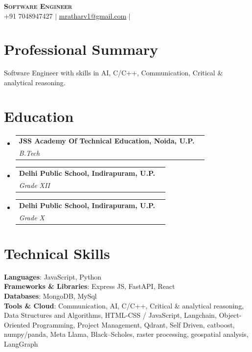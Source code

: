 \documentclass[letterpaper,10pt]{article}
\makeatletter
\newcommand{\resumeSubheading}[4]{
  \vspace{-2pt}\item
    \begin{tabular*}{0.97\textwidth}[t]{l@{\extracolsep{\fill}}r}
      \textbf{#1} & #2 \\
      \textit{\small#3} & \textit{\small #4} \\
    \end{tabular*}\vspace{-7pt}
}
\newcommand{\resumeSubHeadingListStart}{\begin{itemize}[leftmargin=0.15in, label={}]}
\newcommand{\resumeSubHeadingListEnd}{\end{itemize}}
\makeatother
\begin{document}
\begin{center}
    \textbf{\Huge \scshape Software Engineer} \\ \vspace{2pt}
    \small 
    +91 7048947427 $|$     \href{mailto:mratharv1@gmail.com}{\underline{mratharv1@gmail.com}} $|$             \end{center}

\section{Professional Summary}
\small{Software Engineer with skills in AI, C/C++, Communication, Critical \& analytical reasoning.}
\vspace{2pt}

\section{Education}
  \resumeSubHeadingListStart
          \resumeSubheading
        {JSS Academy Of Technical Education, Noida, U.P.}{}
        {B.Tech}{}
          \resumeSubheading
        {Delhi Public School, Indirapuram, U.P.}{}
        {Grade XII}{}
          \resumeSubheading
        {Delhi Public School, Indirapuram, U.P.}{}
        {Grade X}{}
      \resumeSubHeadingListEnd

\section{Technical Skills}
 \begin{itemize}[leftmargin=0.15in, label={}]
    \small{\item{
                        \textbf{Languages}: JavaScript, Python \\
                                \textbf{Frameworks & Libraries}: Express JS, FastAPI, React \\
                                \textbf{Databases}: MongoDB, MySql \\
                                \textbf{Tools & Cloud}: Communication, AI, C/C++, Critical \& analytical reasoning, Data Structures and Algorithms, HTML-CSS / JavaScript, Langchain, Object-Oriented Programming, Project Management, Qdrant, Self Driven, catboost, numpy/panda, Meta Llama, Black–Scholes, raster processing, geospatial analysis, LangGraph \\
                                }}
 \end{itemize}
\end{document}
